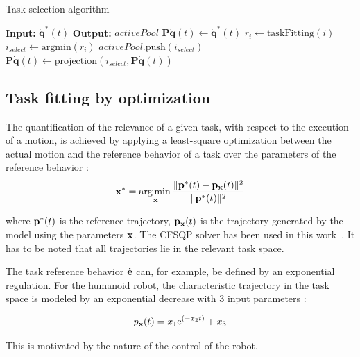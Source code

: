 \documentclass[letterpaper, 10pt, conference]{ieeeconf}      %
\begin{document}
\newcommand{\shOUTPUT}{\textbf{Output: }}
\newcommand{\shINPUT}{\textbf{Input: }}

\begin{algorithm}
  \caption{Task selection algorithm}
  \label{alg:taskSelection}
\begin{algorithmic}[1]
  \STATE \shINPUT $\mathbf{\dot{q}}^{*}(t)$
\STATE \shOUTPUT $activePool$
\STATE $\mathbf{P}\mathbf{\dot{q}}(t)\gets \mathbf{\dot{q}}^{*}(t)$
    \STATE $r_i \gets \mathrm{taskFitting}(i)$
  \ENDFOR
  \STATE $i_{select} \gets \mathrm{argmin}(r_i)$
  \STATE $activePool.\mathrm{push}(i_{select})$
  \STATE $\mathbf{P}\mathbf{\dot{q}}(t) \gets \mathrm{projection}(i_{select}, \mathbf{P}\mathbf{\dot{q}}(t))$
\ENDWHILE
\end{algorithmic}
\end{algorithm}

\subsection{Task fitting by optimization} \label{sec:alg2:proj}
The quantification of the relevance of a given task, with respect to
the execution of a motion, is achieved by applying a least-square optimization
between the actual motion and the reference behavior of a task over the parameters
of the reference behavior :
\begin{equation}
	{\mathbf{x}}^* = \underset{{\mathbf{x}}}{\operatorname*{arg\,min\,}} \frac{\Vert {\mathbf{p}}^*(t) - {\mathbf{p}}_{\mathbf{x}}(t) \Vert^2}{\Vert {\mathbf{p}}^*(t) \Vert^2}
\label{optimProblem}
\end{equation}

\noindent where ${\mathbf{p}}^*(t)$ is the reference trajectory, ${\mathbf{p}}_{\mathbf{x}}(t)$ is the trajectory
generated by the model using the parameters ${\mathbf{x}}$. The CFSQP solver has been used in this work~\cite{lawrence97}.
It has to be noted that all trajectories lie in the relevant task space.

The task reference behavior ${\mathbf{\dot{e}}}$ can, for example, be defined by an exponential regulation.
For the humanoid robot, the characteristic trajectory in the task
space is modeled by an
exponential decrease with 3 input parameters :

\begin{equation}
p_{{\mathbf{x}}}(t) = x_1 \mathrm{e}^{(-x_2 t)} + x_3
\label{eqTask}
\end{equation}

This is motivated by the nature of the control of the
robot.\\
\end{document}

